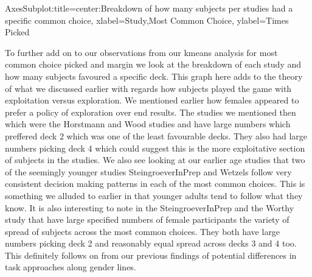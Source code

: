 \documentclass[letterpaper,10pt,english]{jupyterBook}
\begin{document}
\begin{sphinxVerbatim}[commandchars=\\\{\}]
\PYGZlt{}AxesSubplot:title=\PYGZob{}\PYGZsq{}center\PYGZsq{}:\PYGZsq{}Breakdown of how many subjects per studies had a specific common choice\PYGZsq{}\PYGZcb{}, xlabel=\PYGZsq{}Study,Most Common Choice\PYGZsq{}, ylabel=\PYGZsq{}Times Picked\PYGZsq{}\PYGZgt{}
\end{sphinxVerbatim}

\noindent{}

\sphinxAtStartPar
To further add on to our observations from our k\sphinxhyphen{}means analysis for most common choice picked and margin we look at the breakdown of each study and how many subjects favoured a specific deck. This graph here adds to the theory of what we discussed earlier with regards how subjects played the game with exploitation versus exploration. We mentioned earlier how females appeared to prefer a policy of exploration over end results. The studies we mentioned then which were the Horstmann and Wood studies and have large numbers which preffered deck 2 which was one of the least favourable decks. They also had large numbers picking deck 4 which could suggest this is the more exploitative section of subjects in the studies. We also see looking at our earlier age studies that two of the seemingly younger studies SteingroeverInPrep and Wetzels follow very consistent decision making patterns in each of the most common choices. This is something we alluded to earlier in that younger adults tend to follow what they know. It is also interesting to note in the SteingroeverInPrep and the Worthy study that have large specified numbers of female participants the variety of spread of subjects across the most common choices. They both have large numbers picking deck 2 and reasonably equal spread across decks 3 and 4 too. This definitely follows on from our previous findings of potential differences in task approaches along gender lines.

\begin{sphinxVerbatim}[commandchars=\\\{\}]
     
\end{sphinxVerbatim}
\end{document}

